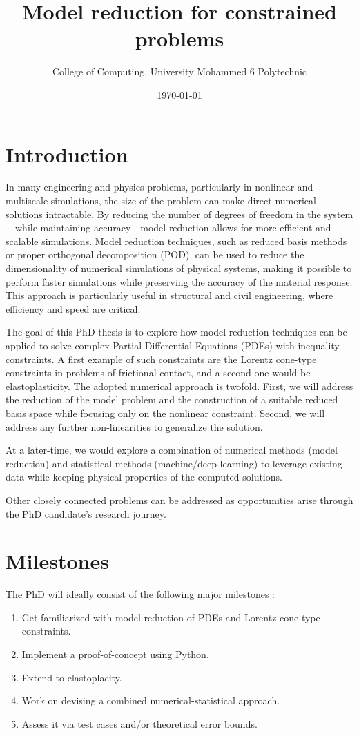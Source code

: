 \documentclass[12pt]{article}
\title{Model reduction for constrained problems }
\author{
	College of Computing, University Mohammed 6 Polytechnic \\
}
\date{\today}
\begin{document}
	
	\maketitle
	
	\section{Introduction}
	In many engineering and physics problems, particularly in nonlinear and multiscale simulations, the size of the problem can make direct numerical solutions intractable. By reducing the number of degrees of freedom in the system—while maintaining accuracy—model reduction allows for more efficient and scalable simulations. 
	Model reduction techniques, such as reduced basis methods or proper orthogonal decomposition (POD), can be used to reduce the dimensionality of numerical simulations of physical systems, making it possible to perform faster simulations while preserving the accuracy of the material response. This approach is particularly useful in structural and civil engineering, where efficiency and speed are critical.
	
	The goal of this PhD thesis is to explore how model reduction techniques can be applied to solve complex Partial Differential Equations (PDEs) with inequality constraints.
	A first example of such constraints are the Lorentz cone-type constraints in problems of frictional contact, and a second one would be elastoplasticity. 
	The adopted numerical approach is twofold. First, we will address the reduction of the model problem and the construction of a suitable reduced basis space while focusing only on the nonlinear constraint. 
	Second, we will address any further non-linearities to generalize the solution.
	
	At a later-time, we would explore a combination of numerical methods (model reduction) and statistical methods (machine/deep learning)  to leverage existing data while keeping physical properties of the computed solutions.
	
	Other closely connected problems can be addressed as opportunities arise through the PhD candidate's research journey.
	
	
	\section{Milestones}
	The PhD will ideally consist of the following major milestones :
	\begin{enumerate}
		\item Get familiarized with model reduction of PDEs and Lorentz cone type constraints.
		\item Implement a proof-of-concept using Python.
		\item Extend to elastoplacity.
		\item Work on devising a combined numerical-statistical approach.
		\item Assess it via test cases and/or theoretical error bounds.
	\end{enumerate}
	
\end{document}
